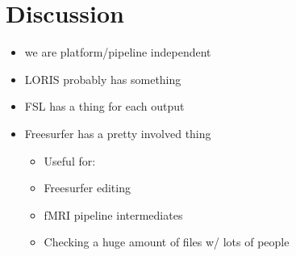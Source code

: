 \section{Discussion}

\begin{itemize}
\item we are platform/pipeline independent
\item LORIS probably has something
\item FSL has a thing for each output
\item Freesurfer has a pretty involved thing
\begin{itemize}
\item Useful for:
\item Freesurfer editing
\item fMRI pipeline intermediates
\item Checking a huge amount of files w/ lots of people
\end{itemize}
\end{itemize}



